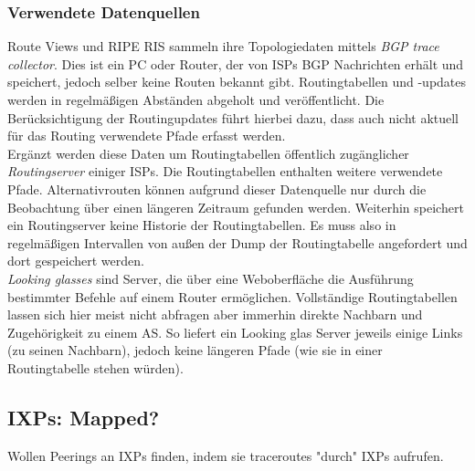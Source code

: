 \subsubsection{Verwendete Datenquellen}
Route Views und RIPE RIS sammeln ihre Topologiedaten mittels \emph{BGP trace collector}.
Dies ist ein PC oder Router, der von ISPs BGP Nachrichten erhält und speichert, jedoch selber keine Routen bekannt gibt.
Routingtabellen und -updates werden in regelmäßigen Abständen abgeholt und veröffentlicht.
Die Berücksichtigung der Routingupdates führt hierbei dazu, dass auch nicht aktuell für das Routing verwendete Pfade erfasst werden.\\

Ergänzt werden diese Daten um Routingtabellen öffentlich zugänglicher \emph{Routingserver} einiger ISPs.
Die Routingtabellen enthalten weitere verwendete Pfade.
Alternativrouten können aufgrund dieser Datenquelle nur durch die Beobachtung über einen längeren Zeitraum gefunden werden.
Weiterhin speichert ein Routingserver keine Historie der Routingtabellen.
Es muss also in regelmäßigen Intervallen von außen der Dump der Routingtabelle angefordert und dort gespeichert werden.\\

\emph{Looking glasses} sind Server, die über eine Weboberfläche die Ausführung bestimmter Befehle auf einem Router ermöglichen.
Vollständige Routingtabellen lassen sich hier meist nicht abfragen aber immerhin direkte Nachbarn und Zugehörigkeit zu einem AS.
So liefert ein Looking glas Server jeweils einige Links (zu seinen Nachbarn), jedoch keine längeren Pfade (wie sie in einer Routingtabelle stehen würden).



\subsection{IXPs: Mapped?~\cite{Augustin:2009:IM:1644893.1644934}}

Wollen Peerings an IXPs finden, indem sie traceroutes "durch" IXPs aufrufen.
